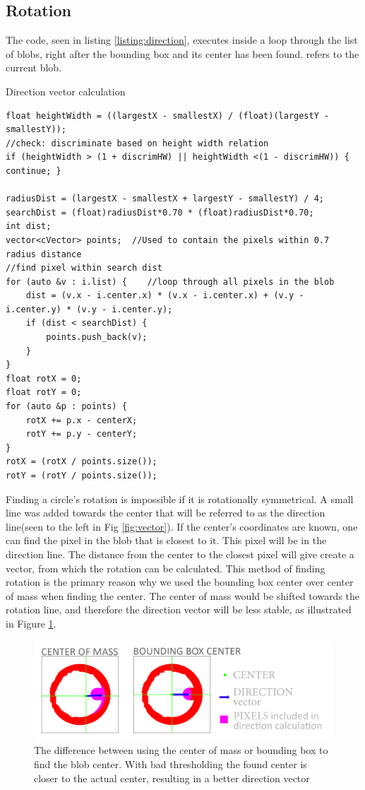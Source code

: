 \subsection{Rotation} 
The code, seen in listing \ref{listing:direction}, executes inside a loop through the list of blobs, right after the bounding box and its center has been found.  refers to the current blob.
\begin{listing}[H]
	\caption{Direction vector calculation}
	\begin{verbatim}
float heightWidth = ((largestX - smallestX) / (float)(largestY - smallestY));
//check: discriminate based on height width relation
if (heightWidth > (1 + discrimHW) || heightWidth <(1 - discrimHW)) { continue; }	

radiusDist = (largestX - smallestX + largestY - smallestY) / 4;
searchDist = (float)radiusDist*0.70 * (float)radiusDist*0.70;
int dist;
vector<cVector> points;  //Used to contain the pixels within 0.7 radius distance
//find pixel within search dist
for (auto &v : i.list) {	//loop through all pixels in the blob
	dist = (v.x - i.center.x) * (v.x - i.center.x) + (v.y - i.center.y) * (v.y - i.center.y);
	if (dist < searchDist) {
		points.push_back(v);
	}
}
float rotX = 0;
float rotY = 0;
for (auto &p : points) {
	rotX += p.x - centerX;
	rotY += p.y - centerY;
}
rotX = (rotX / points.size());
rotY = (rotY / points.size());
	\end{verbatim}
	\label{listing:direction}
\end{listing}
Finding a circle's rotation is impossible if it is rotationally symmetrical. A small line was added towards the center that will be referred to as the direction line(seen to the left in Fig \ref{fig:vector}). If the center's coordinates are known, one can find the pixel in the blob that is closest to it. This pixel will be in the direction line. The distance from the center to the closest pixel will give create a vector, from which the rotation can be calculated. This method of finding rotation is the primary reason why we used the bounding box center over center of mass when finding the center. The center of mass would be shifted towards the rotation line, and therefore the direction vector will be less stable, as illustrated in Figure \ref{fig:boundbox}.\\
\begin{figure}[H]
	\centering
	\includegraphics[width=1\linewidth]{figure/Analysis/boundingbox.png}
	\caption{The difference between using the center of mass or bounding box to find the blob center. With bad thresholding the found center is closer to the actual center, resulting in a better direction vector} 
	\label{fig:boundbox}
\end{figure}

